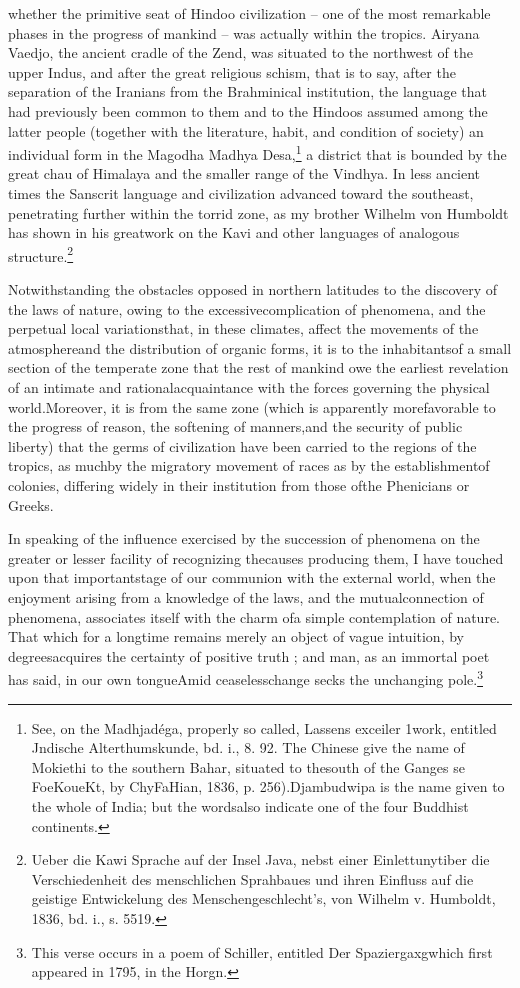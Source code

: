 whether the primitive seat of Hindoo civilization -- one of the most remarkable phases in the progress of mankind -- was actually within the tropics. Airyana Vaedjo, the ancient cradle of the Zend, was situated to the northwest of the upper Indus, and after the great religious schism, that is to say, after the separation of the Iranians from the Brahminical institution, the language that had previously been common to them and to the Hindoos assumed among the latter people (together with the literature, habit, and condition of society) an individual form in the Magodha Madhya Desa,\footnote{See, on the Madhjad\'{e}ga, properly so called, Lassens exceiler 1work, entitled Jndische Alterthumskunde, bd. i., 8. 92. The Chinese give the name of Mokiethi to the southern Bahar, situated to thesouth of the Ganges se FoeKoueKt, by ChyFaHian, 1836, p. 256).Djambudwipa is the name given to the whole of India; but the wordsalso indicate one of the four Buddhist continents.} a district that is bounded by the great chau of Himalaya and the smaller range of the Vindhya. In less ancient times the Sanscrit language and civilization advanced toward the southeast, penetrating further within the torrid zone, as my brother Wilhelm von Humboldt has shown in his greatwork on the Kavi and other languages of analogous structure.\footnote{Ueber die Kawi Sprache auf der Insel Java, nebst einer Einlettunytiber die Verschiedenheit des menschlichen Sprahbaues und ihren Einfluss auf die geistige Entwickelung des Menschengeschlecht's, von Wilhelm v. Humboldt, 1836, bd. i., s. 5519.}

Notwithstanding the obstacles opposed in northern latitudes to the discovery of the laws of nature, owing to the excessivecomplication of phenomena, and the perpetual local variationsthat, in these climates, affect the movements of the atmosphereand the distribution of organic forms, it is to the inhabitantsof a small section of the temperate zone that the rest of mankind owe the earliest revelation of an intimate and rationalacquaintance with the forces governing the physical world.Moreover, it is from the same zone (which is apparently morefavorable to the progress of reason, the softening of manners,and the security of public liberty) that the germs of civilization have been carried to the regions of the tropics, as muchby the migratory movement of races as by the establishmentof colonies, differing widely in their institution from those ofthe Phenicians or Greeks.

In speaking of the influence exercised by the succession of phenomena on the greater or lesser facility of recognizing thecauses producing them, I have touched upon that importantstage of our communion with the external world, when the enjoyment arising from a knowledge of the laws, and the mutualconnection of phenomena, associates itself with the charm ofa simple contemplation of nature. That which for a longtime remains merely an object of vague intuition, by degreesacquires the certainty of positive truth ; and man, as an immortal poet has said, in our own tongueAmid ceaselesschange secks the unchanging pole.\footnote{This verse occurs in a poem of Schiller, entitled Der Spaziergaxgwhich first appeared in 1795, in the Horgn.}

